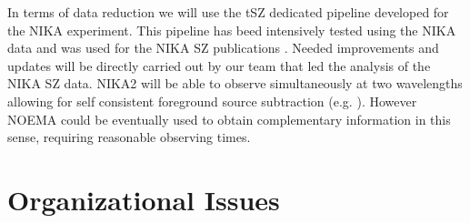 \documentclass[11pt,a4paper,twoside,graphicx,color]{article}
\begin{document}


In terms of data reduction we will use the tSZ dedicated pipeline developed for the NIKA experiment. This pipeline has beed intensively tested
using the NIKA data and was used for the NIKA SZ publications \cite{Adam2014,Adam2015,Adam2016,Adam2016a,Ruppin2016}. 
Needed improvements and updates will be directly carried out by our team that  led the analysis of the NIKA SZ data.
NIKA2 will be able to observe simultaneously at two wavelengths allowing for self consistent foreground source subtraction 
(e.g. \cite{Adam2016a}). 
However NOEMA could be eventually
used to obtain complementary information in this sense, requiring
reasonable observing times.

\section{Organizational Issues}
\end{document}
